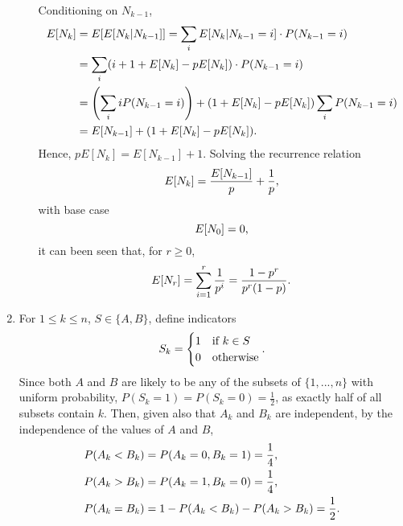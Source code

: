 \documentclass{article}
\begin{document}
\begin{enumerate}
\begin{enumerate}
        Conditioning on $N_{k-1}$,
        \[\begin{split}
        E[N_k] & = E[E[N_k|N_{k-1}]] = \sum_i E[N_k|N_{k-1}=i]\cdot P(N_{k-1}=i) \\
               & = \sum_i ( i + 1 + E[N_k] - pE[N_k] ) \cdot P(N_{k-1}=i) \\
               & = \left(\sum_i iP(N_{k-1}=i)\right) + (1+E[N_k]-pE[N_k])\sum_i P(N_{k-1}=i) \\
               & = E[N_{k-1}] + (1+E[N_k]-pE[N_k])\text.
        \end{split}\]
        Hence, $pE[N_k] = E[N_{k-1}] + 1$.
        Solving the recurrence relation
        $$E[N_k] = \frac{E[N_{k-1}]}{p} + \frac{1}{p}\text,$$
        with base case
        $$E[N_0] = 0\text,$$
        it can been seen that, for $r \geq 0$,
        $$E[N_r] = \sum_{i=1}^r\frac{1}{p^i} = \frac{1-p^r}{p^r(1-p)}\text.$$
    \end{enumerate}
\item
    For $1 \leq k \leq n$, $S \in \{A, B\}$, define indicators
    \[
    S_k =
    \begin{cases}
        1 & \text{if } k \in S \\
        0 & \text{otherwise}
    \end{cases}\text.
    \]
    Since both $A$ and $B$ are likely to be any of the subsets of $\{1,...,n\}$ with uniform probability, $P(S_k=1)=P(S_k=0)=\frac{1}{2}$, as exactly half of all subsets contain $k$.
    Then, given also that $A_k$ and $B_k$ are independent, by the independence of the values of $A$ and $B$,
    \[\begin{split}
    P(A_k < B_k) & = P(A_k=0,B_k=1) = \frac{1}{4}\text, \\
    P(A_k > B_k) & = P(A_k=1,B_k=0) = \frac{1}{4}\text, \\
    P(A_k = B_k) & = 1 - P(A_k<B_k) - P(A_k>B_k) = \frac{1}{2} \text.
    \end{split}\]


\end{enumerate}
\end{document}
